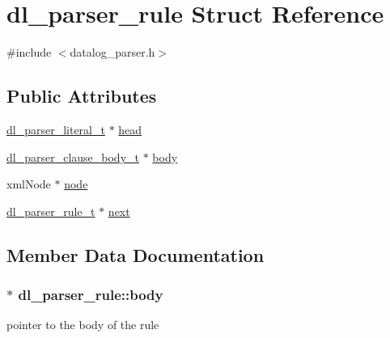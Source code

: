 \hypertarget{structdl__parser__rule}{}\section{dl\+\_\+parser\+\_\+rule Struct Reference}
\label{structdl__parser__rule}


{\ttfamily \#include $<$datalog\+\_\+parser.\+h$>$}

\subsection*{Public Attributes}
\begin{DoxyCompactItemize}
\item 
\hyperlink{datalog__parser_8h_adaef2eede58b9f7698925f7194af1373}{dl\+\_\+parser\+\_\+literal\+\_\+t} $\ast$ \hyperlink{structdl__parser__rule_a5db876663753e120f3e9317bd50846f8}{head}
\item 
\hyperlink{datalog__parser_8h_a2703a04ed12cb47b11a83f37badc09b5}{dl\+\_\+parser\+\_\+clause\+\_\+body\+\_\+t} $\ast$ \hyperlink{structdl__parser__rule_aa1f942f462503bb108d1af4da3f6f51d}{body}
\item 
xml\+Node $\ast$ \hyperlink{structdl__parser__rule_ab1344f0e0e232256a9de89baaf709466}{node}
\item 
\hyperlink{datalog__parser_8h_a8024697b9e41c6c143acefaaf5d047cd}{dl\+\_\+parser\+\_\+rule\+\_\+t} $\ast$ \hyperlink{structdl__parser__rule_a8cd9d240d0c0376f0613b84266b64eac}{next}
\end{DoxyCompactItemize}


\subsection{Member Data Documentation}
\subsubsection[{\texorpdfstring{body}{body}}]{$\ast$ dl\+\_\+parser\+\_\+rule\+::body}\hypertarget{structdl__parser__rule_aa1f942f462503bb108d1af4da3f6f51d}{}\label{structdl__parser__rule_aa1f942f462503bb108d1af4da3f6f51d}
pointer to the body of the rule 
